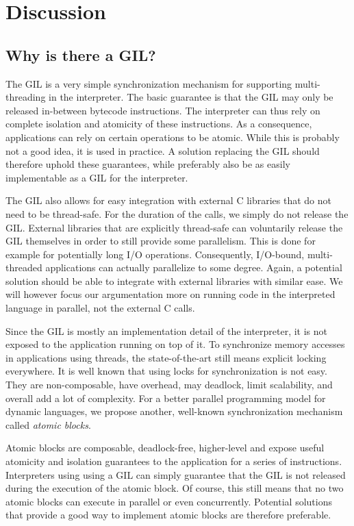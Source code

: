 \documentclass{sigplanconf}
\begin{document}
\section{Discussion}
\subsection{Why is there a GIL?}
The GIL is a very simple synchronization mechanism for supporting
multi-threading in the interpreter. The basic guarantee is that the
GIL may only be released in-between bytecode instructions. The
interpreter can thus rely on complete isolation and atomicity of these
instructions. As a consequence, applications can rely on certain
operations to be atomic. While this is probably not a good idea,
it is used in practice. A solution replacing the GIL should therefore
uphold these guarantees, while preferably also be as easily
implementable as a GIL for the interpreter.

The GIL also allows for easy integration with external C libraries that
do not need to be thread-safe. For the duration of the calls, we
simply do not release the GIL. External libraries that are explicitly
thread-safe can voluntarily release the GIL themselves in order to
still provide some parallelism. This is done for example for
potentially long I/O operations. Consequently, I/O-bound,
multi-threaded applications can actually parallelize to some
degree. Again, a potential solution should be able to integrate with
external libraries with similar ease. We will however focus our
argumentation more on running code in the interpreted language in
parallel, not the external C calls.

Since the GIL is mostly an implementation detail of the interpreter,
it is not exposed to the application running on top of it. To
synchronize memory accesses in applications using threads, the
state-of-the-art still means explicit locking everywhere. It is well
known that using locks for synchronization is not easy.  They are
non-composable, have overhead, may deadlock, limit scalability, and
overall add a lot of complexity. For a better parallel programming
model for dynamic languages, we propose another, well-known
synchronization mechanism called \emph{atomic blocks}.

Atomic blocks are composable, deadlock-free, higher-level and expose
useful atomicity and isolation guarantees to the application for a
series of instructions.  Interpreters using using a GIL can simply
guarantee that the GIL is not released during the execution of the
atomic block. Of course, this still means that no two atomic blocks
can execute in parallel or even concurrently. Potential solutions
that provide a good way to implement atomic blocks are therefore
preferable.
\end{document}
